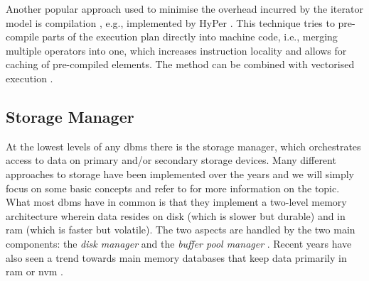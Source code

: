 Another popular approach used to minimise the overhead incurred by the iterator model is compilation \cite{Krolik:2021r3d3,Funke:2021Low}, e.g., implemented by HyPer \cite{Neumann:2011Efficiently,Neumann:2014Compiling,Blacher:2022Machine}. This technique tries to pre-compile parts of the execution plan directly into machine code, i.e., merging multiple operators into one, which increases instruction locality and allows for caching of pre-compiled elements. The method can be combined with vectorised execution \cite{Sompolski:2011Vectorization,Rosenfeld:2022Query}.

\subsection{Storage Manager}
\label{section:databases_storage_manager}
At the lowest levels of any \acrshort{dbms} there is the storage manager, which orchestrates access to data on primary and/or secondary storage devices. Many different approaches to storage have been implemented over the years and we will simply focus on some basic concepts and refer to \cite{Petrov:2019Database} for more information on the topic. What most \acrshort{dbms} have in common is that they implement a two-level memory architecture wherein data resides on disk (which is slower but durable) and in \acrshort{ram} (which is faster but volatile). The two aspects are handled by the two main components: the \emph{disk manager} and the \emph{buffer pool manager} \cite{Petrov:2019Database}. Recent years have also seen a trend towards main memory databases that keep data primarily in \acrshort{ram} \cite{Garcia:1992Main,Faerber:2017Main} or \acrfull{nvm} \cite{Arulraj:2017Build}.

